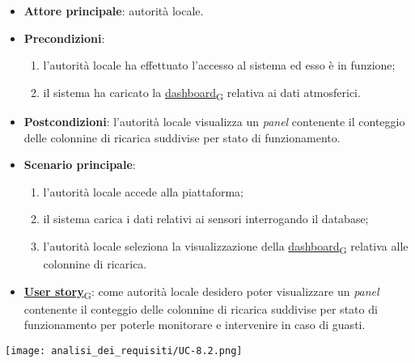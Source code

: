 \newpage

\begin{itemize}
	\item \textbf{Attore principale}: autorità locale.
	\item \textbf{Precondizioni}:
	      \begin{enumerate}
		      \item l'autorità locale ha effettuato l'accesso al sistema ed esso è in funzione;
		      \item il sistema ha caricato la \href{https://7last.github.io/docs/rtb/documentazione-interna/glossario\#dashboard}{dashboard\textsubscript{G}} relativa ai dati atmosferici.
	      \end{enumerate}
	\item \textbf{Postcondizioni}: l'autorità locale visualizza un \textit{panel} contenente il conteggio delle colonnine di ricarica suddivise per stato di funzionamento.
	\item \textbf{Scenario principale}:
	      \begin{enumerate}
		      \item l'autorità locale accede alla piattaforma;
		      \item il sistema carica i dati relativi ai sensori interrogando il database;
		      \item l'autorità locale seleziona la visualizzazione della \href{https://7last.github.io/docs/rtb/documentazione-interna/glossario\#dashboard}{dashboard\textsubscript{G}} relativa alle colonnine di ricarica.
	      \end{enumerate}
	\item \href{https://7last.github.io/docs/rtb/documentazione-interna/glossario\#user-story}{\textbf{User story}\textsubscript{G}}:
	      come autorità locale desidero poter visualizzare un \textit{panel} contenente il conteggio delle colonnine di ricarica suddivise per stato di funzionamento
	      per poterle monitorare e intervenire in caso di guasti.
\end{itemize}
\begin{center}
	\texttt{[image: analisi\_dei\_requisiti/UC-8.2.png]}
\end{center}

